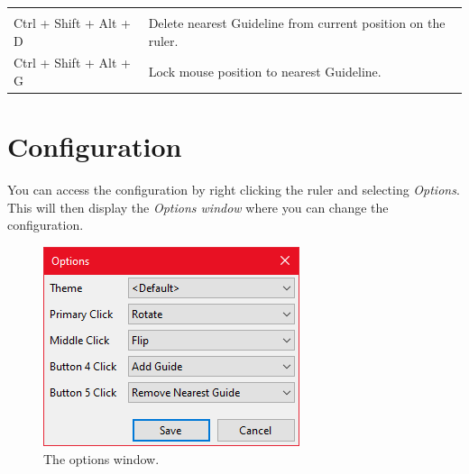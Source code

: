 \documentclass[
]{book}
\begin{document}
\begin{longtable}[]{@{}ll@{}}
\begin{minipage}[t]{0.68\columnwidth}
\end{minipage}\tabularnewline
\begin{minipage}[t]{0.27\columnwidth}\raggedright
Ctrl + Shift + Alt + D\strut
\end{minipage} & \begin{minipage}[t]{0.68\columnwidth}\raggedright
Delete nearest Guideline from current position on the ruler.\strut
\end{minipage}\tabularnewline
\begin{minipage}[t]{0.27\columnwidth}\raggedright
Ctrl + Shift + Alt + G\strut
\end{minipage} & \begin{minipage}[t]{0.68\columnwidth}\raggedright
Lock mouse position to nearest Guideline.\strut
\end{minipage}\tabularnewline
\bottomrule
\end{longtable}

\hypertarget{config}{%
\chapter{Configuration}\label{config}}

You can access the configuration by right clicking the ruler and selecting \emph{Options}.
This will then display the \emph{Options window} where you can change the configuration.

\begin{figure}
\includegraphics[width=1\linewidth]{images/options} \caption{The options window.}\label{fig:unnamed-chunk-3}
\end{figure}
\end{document}
